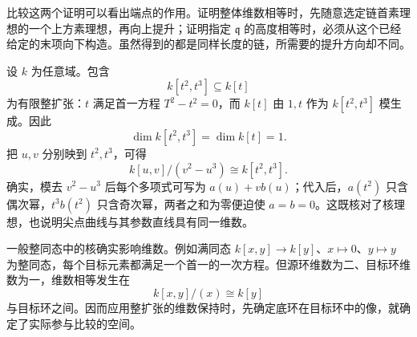 比较这两个证明可以看出端点的作用。证明整体维数相等时，先随意选定链首素理想的一个上方素理想，再向上提升；证明指定 \(\mathfrak q\) 的高度相等时，必须从这个已经给定的末项向下构造。虽然得到的都是同样长度的链，所需要的提升方向却不同。

\begin{example}\label{g5:exm:integral-dimension-cusp}
	设 \(k\) 为任意域。包含
	\[
	k[t^2,t^3]\subseteq k[t]
	\]
	为有限整扩张：\(t\) 满足首一方程 \(T^2-t^2=0\)，而 \(k[t]\) 由 \(1,t\) 作为 \(k[t^2,t^3]\) 模生成。因此
	\[
	\dim k[t^2,t^3]=\dim k[t]=1.
	\]
	把 \(u,v\) 分别映到 \(t^2,t^3\)，可得
	\[
	k[u,v]/(v^2-u^3)\cong k[t^2,t^3].
	\]
	确实，模去 \(v^2-u^3\) 后每个多项式可写为 \(a(u)+v b(u)\)；代入后，\(a(t^2)\) 只含偶次幂，\(t^3b(t^2)\) 只含奇次幂，两者之和为零便迫使 \(a=b=0\)。这既核对了核理想，也说明尖点曲线与其参数直线具有同一维数。
\end{example}

一般整同态中的核确实影响维数。例如满同态 \(k[x,y]\rightarrow k[y]\)、\(x\mapsto0\)、\(y\mapsto y\) 为整同态，每个目标元素都满足一个首一的一次方程。但源环维数为二、目标环维数为一，维数相等发生在
\[
	k[x,y]/(x)\cong k[y]
\]
与目标环之间。因而应用整扩张的维数保持时，先确定底环在目标环中的像，就确定了实际参与比较的空间。
